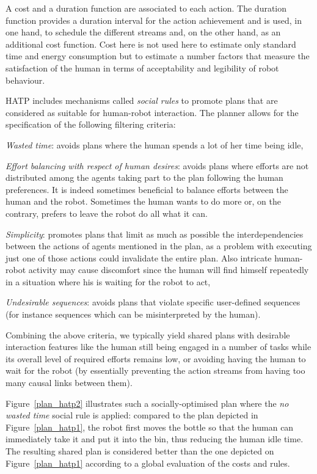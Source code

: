 \documentclass[preprint,3p,times]{elsarticle}
\begin{document}
A cost and a duration function are associated to each action.  The duration
function provides a duration interval for the action achievement and is used, in
one hand, to schedule the different streams and, on the other hand, as an
additional cost function. Cost here is not used here to estimate only standard time and energy consumption but
to estimate a number factors that measure the satisfaction of the human in terms
of acceptability and legibility of robot behaviour.  

HATP includes mechanisms called \emph{social rules} to promote plans that are
considered as suitable for human-robot interaction. The planner
allows for the specification of the following filtering criteria:

\emph{Wasted time}: avoids plans where the human spends a lot
of her time being idle,

\emph{Effort balancing with respect of human desires}: avoids plans where efforts are
not distributed among the agents taking part to the plan following the human preferences.  It is
indeed sometimes beneficial to balance efforts between the human and
the robot. Sometimes the human wants to do more or, on the contrary, prefers to leave the 
robot do all what it can. 

\emph{Simplicity}: promotes plans that limit as much as possible the interdependencies
between the actions of agents mentioned in the plan, as a problem with
executing just one of those actions could invalidate the entire
plan. Also intricate human-robot activity may cause discomfort since
the human will find himself repeatedly in a situation where his is
waiting for the robot to act,

\emph{Undesirable sequences}: avoids plans that violate specific user-defined
sequences (for instance sequences which can be misinterpreted by the human).

Combining the above criteria, we typically yield shared plans with desirable
interaction features like the human still being engaged in a number of tasks
while its overall level of required efforts remains low, or avoiding having the
human to wait for the robot (by essentially preventing the action streams from
having too many causal links between them).

Figure~\ref{plan_hatp2} illustrates such a socially-optimised plan where the
\emph{no wasted time} social rule is applied: compared to the plan depicted in
Figure~\ref{plan_hatp1}, the robot first moves the bottle so that the human can
immediately take it and put it into the bin, thus reducing the human idle time.
The resulting shared plan is considered better than the one depicted on
Figure~\ref{plan_hatp1} according to a global evaluation of the costs and rules.
\end{document}
